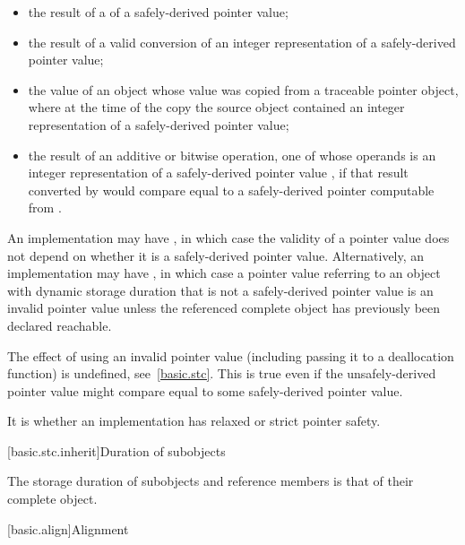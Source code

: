\begin{itemize}
\item the result of a  of a safely-derived pointer value;

\item the result of a valid conversion of an integer representation of a safely-derived
pointer value;

\item the value of an object whose value was copied from a traceable pointer object,
where at the time of the copy the source object contained an integer representation of a
safely-derived pointer value;

\item the result of an additive or bitwise operation, one of whose operands is an
integer representation of a safely-derived pointer value , if that result
converted by  would compare equal to a safely-derived
pointer computable from .
\end{itemize}

\pnum
An implementation may have , in which case the
validity of a pointer value does not depend on whether it is a safely-derived
pointer value. Alternatively, an implementation may have , in which case a pointer value referring to an object with dynamic
storage duration that is not a safely-derived pointer
value is an invalid pointer value unless
the referenced complete object has previously been declared
reachable. \begin{note}
The effect of using an invalid pointer value (including passing it to a
deallocation function) is undefined, see~\ref{basic.stc}.
This is true even if the unsafely-derived pointer value might compare equal to
some safely-derived pointer value. \end{note} It is
 whether an implementation has relaxed or strict pointer safety.%
%

[basic.stc.inherit]{Duration of subobjects}

\pnum
{}%
The storage duration of subobjects and reference members
is that of their complete object.
%

[basic.align]{Alignment}

